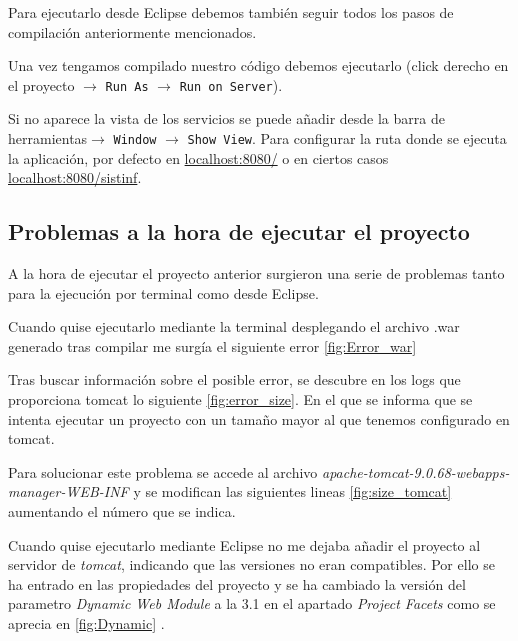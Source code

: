 Para ejecutarlo desde Eclipse debemos también seguir todos los pasos de compilación anteriormente mencionados.

Una vez tengamos compilado nuestro código debemos ejecutarlo (click derecho en el proyecto $\rightarrow$ \texttt{Run As} $\rightarrow$ \texttt{Run on Server}).

Si no aparece la vista de los servicios se puede añadir desde la barra de herramientas$\rightarrow$ \texttt{Window} $\rightarrow$ \texttt{Show View}. Para configurar la ruta donde se ejecuta la aplicación, por defecto en \href{http://localhost:8080/}{localhost:8080/} o en ciertos casos \href{http://localhost:8080/sistinf}{localhost:8080/sistinf}.

\subsection{Problemas a la hora de ejecutar el proyecto}

A la hora de ejecutar el proyecto anterior surgieron una serie de problemas tanto para la ejecución por terminal como desde Eclipse.

Cuando quise ejecutarlo mediante la terminal desplegando el archivo .war generado tras compilar me surgía el siguiente error \ref{fig:Error_war}


Tras buscar información sobre el posible error, se descubre en los logs que proporciona tomcat lo siguiente \ref{fig:error_size}. En el que se informa que se intenta ejecutar un proyecto con un tamaño mayor al que tenemos configurado en tomcat.


Para solucionar este problema se accede al archivo \emph{apache-tomcat-9.0.68-webapps-manager-WEB-INF} y se modifican las siguientes lineas \ref{fig:size_tomcat} aumentando el número que se indica.


Cuando quise ejecutarlo mediante Eclipse no me dejaba añadir el proyecto al servidor de \emph{tomcat}, indicando que las versiones no eran compatibles. Por ello se ha entrado en las propiedades del proyecto y se ha cambiado la versión del parametro \emph{Dynamic Web Module} a la 3.1 en el apartado \emph{Project Facets} como se aprecia en \ref{fig:Dynamic} .

